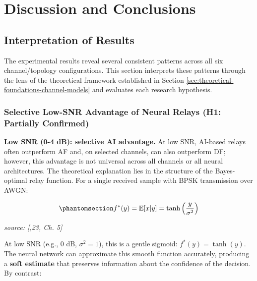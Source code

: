 \chapter{Discussion and Conclusions}\label{sec:discussion-and-conclusions}

\section{Interpretation of Results}\label{sec:interpretation-of-results}

The experimental results reveal several consistent patterns across all six channel/topology configurations. This section interprets these patterns through the lens of the theoretical framework established in Section \ref{sec:theoretical-foundations-channel-models}  and evaluates each research hypothesis.

\subsection{Selective Low-SNR Advantage of Neural Relays (H1: Partially Confirmed)}\label{sec:selective-low-snr-advantage-of-neural-relays-h1-partially-confirmed}

\textbf{Low SNR (0-4 dB): selective AI advantage.} At low SNR, AI-based relays often outperform AF and, on selected channels, can also outperform DF; however, this advantage is not universal across all channels or all neural architectures. The theoretical explanation lies in the structure of the Bayes-optimal relay function. For a single received sample with BPSK transmission over AWGN:

\begin{equation}\protect\phantomsection\label{eq:optimal-denoiser-relay}{f^*(y) = \mathbb{E}[x | y] = \tanh\left(\frac{y}{\sigma^2}\right)
}\end{equation} \par{\small\textit{source: [\cite{He2015DelvingRectifiers},23, Ch. 5]}}

At low SNR (e.g., 0 dB, \(\sigma^2 = 1\)), this is a gentle sigmoid: \(f^*(y) = \tanh(y)\). The neural network can approximate this smooth function accurately, producing a \textbf{soft estimate} that preserves information about the confidence of the decision. By contrast:

